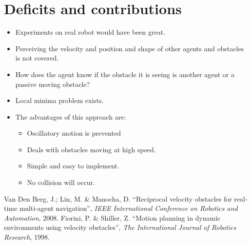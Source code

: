 \documentclass[12pt]{article}
\begin{document}
\section{Deficits and contributions}
\begin{itemize}
    \item Experiments on real robot would have been great.
    \item Perceiving the velocity and position and shape of other agents and obstacles is not covered.
    \item How does the agent know if the obstacle it is seeing is another agent or a passive moving obstacle?
    \item Local minima problem exists.
    \item The advantages of this approach are:
        \begin{itemize}
            \item Oscillatory motion is prevented
            \item Deals with obstacles moving at high speed.
            \item Simple and easy to implement.
            \item No collision will occur.
        \end{itemize}
\end{itemize}

\begin{thebibliography}{1}
     Van Den Berg, J.; Lin, M. \& Manocha, D. ``Reciprocal velocity obstacles for real-time multi-agent navigation'', \textit{IEEE International Conference on Robotics and Automation}, 2008.
     Fiorini, P. \& Shiller, Z. ``Motion planning in dynamic environments using velocity obstacles'', \textit{The International Journal of Robotics Research}, 1998.
\end{thebibliography}
\end{document}

